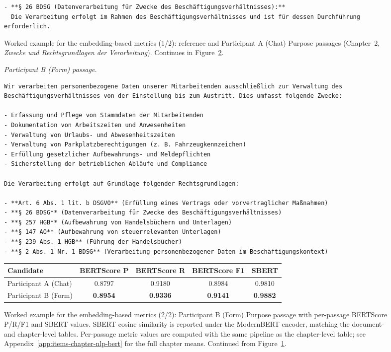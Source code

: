 \begin{figure}[!htbp]
\begin{lstlisting}
- **§ 26 BDSG (Datenverarbeitung für Zwecke des Beschäftigungsverhältnisses):**
  Die Verarbeitung erfolgt im Rahmen des Beschäftigungsverhältnisses und ist für dessen Durchführung erforderlich.
\end{lstlisting}

\caption{Worked example for the embedding-based metrics (1/2):
reference and Participant A (Chat) Purpose passages (Chapter~2,
\emph{Zwecke und Rechtsgrundlagen der Verarbeitung}). Continues
in Figure~\ref{fig:worked-semantic-b}.}
\label{fig:worked-semantic-a}
\end{figure}

\begin{figure}[!htbp]
\centering
\noindent\textit{Participant B (Form) passage.}
\begin{lstlisting}
Wir verarbeiten personenbezogene Daten unserer Mitarbeitenden ausschließlich zur Verwaltung des Beschäftigungsverhältnisses von der Einstellung bis zum Austritt. Dies umfasst folgende Zwecke:

- Erfassung und Pflege von Stammdaten der Mitarbeitenden
- Dokumentation von Arbeitszeiten und Anwesenheiten
- Verwaltung von Urlaubs- und Abwesenheitszeiten
- Verwaltung von Parkplatzberechtigungen (z. B. Fahrzeugkennzeichen)
- Erfüllung gesetzlicher Aufbewahrungs- und Meldepflichten
- Sicherstellung der betrieblichen Abläufe und Compliance

Die Verarbeitung erfolgt auf Grundlage folgender Rechtsgrundlagen:

- **Art. 6 Abs. 1 lit. b DSGVO** (Erfüllung eines Vertrags oder vorvertraglicher Maßnahmen)
- **§ 26 BDSG** (Datenverarbeitung für Zwecke des Beschäftigungsverhältnisses)
- **§ 257 HGB** (Aufbewahrung von Handelsbüchern und Unterlagen)
- **§ 147 AO** (Aufbewahrung von steuerrelevanten Unterlagen)
- **§ 239 Abs. 1 HGB** (Führung der Handelsbücher)
- **§ 2 Abs. 1 Nr. 1 BDSG** (Verarbeitung personenbezogener Daten im Beschäftigungskontext)
\end{lstlisting}

\vspace{0.5ex}
\begin{tabular}{@{}l c c c c@{}}
\toprule
Candidate    & BERTScore P & BERTScore R & BERTScore F1 & SBERT \\
\midrule
Participant A (Chat) & 0.8797      & 0.9180      & 0.8984       & 0.9810 \\
Participant B (Form) & \textbf{0.8954}      & \textbf{0.9336}      & \textbf{0.9141}       & \textbf{0.9882} \\
\bottomrule
\end{tabular}
\caption{Worked example for the embedding-based metrics (2/2):
Participant B (Form) Purpose passage with per-passage BERTScore P/R/F1
and SBERT values. SBERT cosine similarity is reported under the
ModernBERT encoder, matching the document- and chapter-level
tables. Per-passage metric values are computed with the same
pipeline as the chapter-level table; see
Appendix~\ref{app:items-chapter-nlp-bert} for the full chapter
means. Continued from Figure~\ref{fig:worked-semantic-a}.}
\label{fig:worked-semantic-b}
\end{figure}
\endgroup

